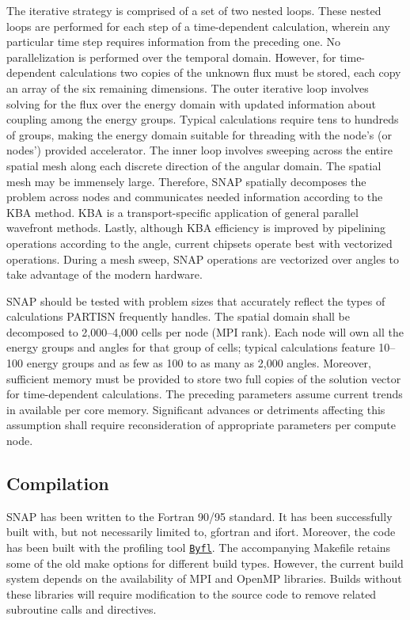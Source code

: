 The iterative strategy is comprised of a set of two nested loops. These nested loops are performed for each step of a time-\/dependent calculation, wherein any particular time step requires information from the preceding one. No parallelization is performed over the temporal domain. However, for time-\/dependent calculations two copies of the unknown flux must be stored, each copy an array of the six remaining dimensions. The outer iterative loop involves solving for the flux over the energy domain with updated information about coupling among the energy groups. Typical calculations require tens to hundreds of groups, making the energy domain suitable for threading with the node's (or nodes') provided accelerator. The inner loop involves sweeping across the entire spatial mesh along each discrete direction of the angular domain. The spatial mesh may be immensely large. Therefore, S\-N\-A\-P spatially decomposes the problem across nodes and communicates needed information according to the K\-B\-A method. K\-B\-A is a transport-\/specific application of general parallel wavefront methods. Lastly, although K\-B\-A efficiency is improved by pipelining operations according to the angle, current chipsets operate best with vectorized operations. During a mesh sweep, S\-N\-A\-P operations are vectorized over angles to take advantage of the modern hardware.

S\-N\-A\-P should be tested with problem sizes that accurately reflect the types of calculations P\-A\-R\-T\-I\-S\-N frequently handles. The spatial domain shall be decomposed to 2,000--4,000 cells per node (M\-P\-I rank). Each node will own all the energy groups and angles for that group of cells; typical calculations feature 10--100 energy groups and as few as 100 to as many as 2,000 angles. Moreover, sufficient memory must be provided to store two full copies of the solution vector for time-\/dependent calculations. The preceding parameters assume current trends in available per core memory. Significant advances or detriments affecting this assumption shall require reconsideration of appropriate parameters per compute node.

\subsection*{Compilation}

S\-N\-A\-P has been written to the Fortran 90/95 standard. It has been successfully built with, but not necessarily limited to, gfortran and ifort. Moreover, the code has been built with the profiling tool \href{https://github.com/losalamos/byfl}{\tt Byfl}. The accompanying Makefile retains some of the old make options for different build types. However, the current build system depends on the availability of M\-P\-I and Open\-M\-P libraries. Builds without these libraries will require modification to the source code to remove related subroutine calls and directives.

